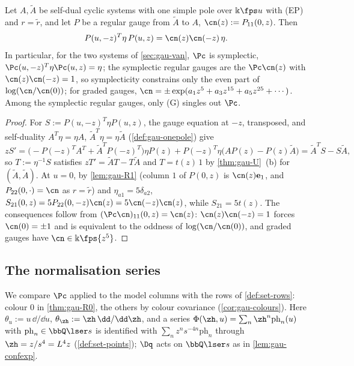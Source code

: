 \begin{prop}[Symplecticity]
\label{prop:gau-symp}
Let $A,\tilde A$ be self-dual cyclic systems with one simple pole over $\Bbbk\fps u$ with (EP) and $r=\tilde r$, and let $P$ be a regular gauge from $\tilde A$ to $A$, $\cn(z):=P_{11}(0,z)$. Then
\begin{equation}
\label{eq:gau-symp}
P(u,-z)^T\eta\,P(u,z)=\cn(z)\cn(-z)\,\eta .
\end{equation}
In particular, for the two systems of \cref{sec:gau-van}, $\Pc$ is symplectic, $\Pc(u,-z)^T\eta\Pc(u,z)=\eta$; the symplectic regular gauges are the $\Pc\cn(z)$ with $\cn(z)\cn(-z)=1$, so symplecticity constrains only the even part of $\log(\cn/\cn(0))$; for graded gauges, $\cn=\pm\exp(a_1z^5+a_3z^{15}+a_5z^{25}+\cdots)$. Among the symplectic regular gauges, only (G) singles out $\Pc$.
\end{prop}

\begin{proof}
For $S:=P(u,-z)^T\eta P(u,z)$, the gauge equation at $-z$, transposed, and self-duality $A^T\eta=\eta A$, $\tilde A^T\eta=\eta\tilde A$ (\cref{def:gau-onepole}) give
\[
zS'=\bigl(-P(-z)^TA^T+\tilde A^TP(-z)^T\bigr)\eta P(z)+P(-z)^T\eta\bigl(AP(z)-P(z)\tilde A\bigr)=\tilde A^TS-S\tilde A,
\]
so $T:=\eta^{-1}S$ satisfies $zT'=\tilde AT-T\tilde A$ and $T=t(z)\,1$ by \cref{thm:gau-U}~(b) for $(\tilde A,\tilde A)$. At $u=0$, by \cref{lem:gau-R1} (column $1$ of $P(0,z)$ is $\cn(z)\mathbf e_1$, and $P_{22}(0,\cdot)=\cn$ as $r=\tilde r$) and $\eta_{a1}=5\delta_{a2}$, $S_{21}(0,z)=5P_{22}(0,-z)\cn(z)=5\cn(-z)\cn(z)$, while $S_{21}=5t(z)$. The consequences follow from $(\Pc\cn)_{11}(0,z)=\cn(z)$: $\cn(z)\cn(-z)=1$ forces $\cn(0)=\pm1$ and is equivalent to the oddness of $\log(\cn/\cn(0))$, and graded gauges have $\cn\in\Bbbk\fps{z^5}$.
\end{proof}

\subsection{The normalisation series}
\label{sec:gau-R0}

We compare $\Pc$ applied to the model columns with the rows of \cref{def:set-rows}: colour $0$ in \cref{thm:gau-R0}, the others by colour covariance (\cref{cor:gau-colours}). Here $\theta_u:=u\,\dd/\dd u$, $\theta_{\zh}:=\zh\,\dd/\dd\zh$, and a series $\Phi(\zh,u)=\sum_n\zh^n\mathrm{ph}_n(u)$ with $\mathrm{ph}_n\in\bbQ\lser s$ is identified with $\sum_nz^ns^{-4n}\mathrm{ph}_n$ through $\zh=z/s^4=L^4z$ (\cref{def:set-points}); $\Dq$ acts on $\bbQ\lser s$ as in \cref{lem:gau-confexp}.

